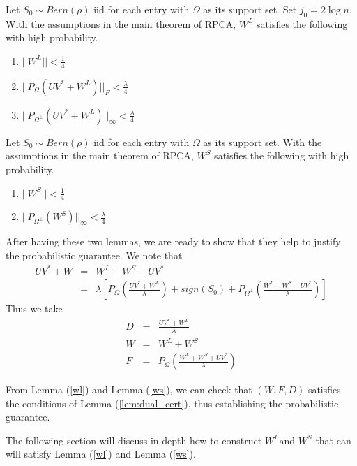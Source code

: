 \begin{lemma} \label{wl} Let $S_0\sim Bern(\rho)$ iid for each entry with $\Omega$
as its support set. Set $j_{0}=2\log n$. With the assumptions in
the main theorem of RPCA, $W^{L}$ satisfies the following with high
probability.
\begin{enumerate}
\item $||W^{L}||<\frac{1}{4}$
\item $||P_{\Omega}(UV^{*}+W^{L})||_{F}<\frac{\lambda}{4}$
\item $||P_{\Omega^{\bot}}(UV^{*}+W^{L})||_{\infty}<\frac{\lambda}{4}$
\end{enumerate}
\end{lemma}

\begin{lemma} \label{ws} Let $S_0\sim Bern(\rho)$ iid for each entry with $\Omega$
as its support set. With the assumptions in the main theorem of RPCA,
$W^{S}$ satisfies the following with high probability.
\begin{enumerate}
\item $||W^{S}||<\frac{1}{4}$
\item $||P_{\Omega^{\bot}}(W^{S})||_{\infty}<\frac{\lambda}{4}$
\end{enumerate}
\end{lemma}

After having these two lemmas, we are ready to show that they help to justify the probabilistic guarantee. We note that
\begin{eqnarray*}
UV^{*}+W & = & W^{L}+W^{S}+UV^{*}\\
 & = & \lambda[P_{\Omega}(\frac{UV^{*}+W^{L}}{\lambda})+sign(S_{0})+P_{\Omega^{\bot}}(\frac{W^{L}+W^{S}+UV^{*}}{\lambda})]
\end{eqnarray*}
Thus we take
\begin{eqnarray*}
D & = & \frac{UV^{*}+W^{L}}{\lambda}\\
W & = & W^{L}+W^{S}\\
F & = & P_{\Omega}(\frac{W^{L}+W^{S}+UV^{*}}{\lambda})
\end{eqnarray*}


From Lemma (\ref{wl}) and Lemma (\ref{ws}), we can check that $(W,F,D)$
satisfies the conditions of Lemma (\ref{lem:dual_cert}), thus establishing the probabilistic
guarantee.

The following section will discuss in depth how to construct $W^{L}$and $W^{S}$ that can
will satisfy   Lemma (\ref{wl}) and Lemma (\ref{ws}). 